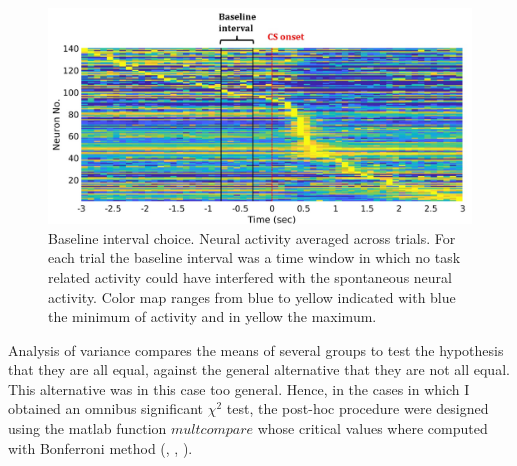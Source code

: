 \begin{figure}
\centering
\includegraphics[scale=0.56]{figures/Baseline.pdf}
\caption{Baseline interval choice. Neural activity averaged across trials. For each trial the baseline interval was a time window in which no task related activity could have interfered with the spontaneous neural activity. Color map ranges from blue to yellow indicated with blue the minimum of activity and in yellow the maximum.}
\label{fig:Baseline}
\end{figure}
Analysis of variance compares the means of several groups to test the hypothesis that they are all equal, against the general alternative that they are not all equal. This alternative was in this case too general. Hence, in the cases in which I obtained an omnibus significant $\chi^2$ test, the post-hoc procedure were designed using the matlab function $\textit{multcompare}$ whose critical values where computed with Bonferroni method (\cite{Bonferroni}, \cite{Dunn1958}, \cite{Dunn1961}).\\
